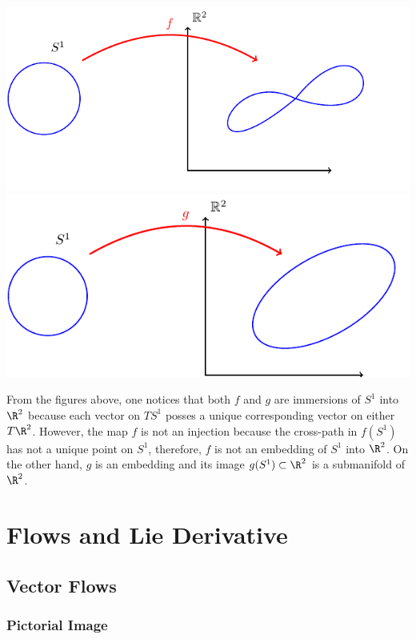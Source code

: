 \begin{center}
  \includegraphics[scale=.7]{Pict/tikz-immersion.pdf}
  \includegraphics[scale=.7]{Pict/tikz-embedding.pdf}
\end{center}

From the figures above, one notices that both $f$ and $g$ are immersions of $S^1$ into $\R^2$ because each  vector on $TS^1$ posses a unique corresponding vector on either $T\R^2$. However, the map $f$ is not an injection because the cross-path in $f(S^1)$ has not a unique point on $S^1$, therefore, $f$ is not an embedding of $S^1$ into $\R^2$. On the other hand, $g$ is an embedding and its image $g(S^1)\subset \R^2$ is a submanifold of $\R^2$.

\section{Flows and Lie Derivative}

\subsection{Vector Flows}

\subsubsection*{Pictorial Image}

